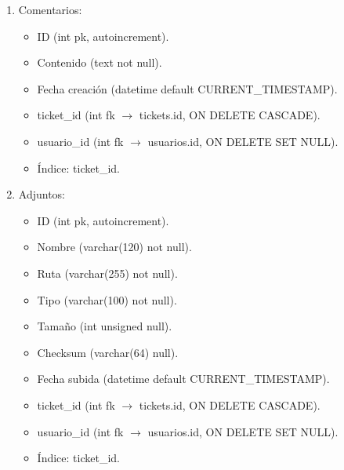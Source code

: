 \documentclass[letter,12pt]{article}
\begin{document}
\begin{enumerate}[leftmargin=*]
    \item Comentarios:
    \begin{itemize}[leftmargin=1.5em,noitemsep,topsep=0pt]
        \item ID (int pk, autoincrement).
        \item Contenido (text not null).
        \item Fecha creación (datetime default CURRENT\_TIMESTAMP).
        \item ticket\_id (int fk $\rightarrow$ tickets.id, ON DELETE CASCADE).
        \item usuario\_id (int fk $\rightarrow$ usuarios.id, ON DELETE SET NULL).
        \item Índice: ticket\_id.
    \end{itemize}

    \item Adjuntos:
    \begin{itemize}[leftmargin=1.5em,noitemsep,topsep=0pt]
        \item ID (int pk, autoincrement).
        \item Nombre (varchar(120) not null).
        \item Ruta (varchar(255) not null).
        \item Tipo (varchar(100) not null).
        \item Tamaño (int unsigned null).
        \item Checksum (varchar(64) null).
        \item Fecha subida (datetime default CURRENT\_TIMESTAMP).
        \item ticket\_id (int fk $\rightarrow$ tickets.id, ON DELETE CASCADE).
        \item usuario\_id (int fk $\rightarrow$ usuarios.id, ON DELETE SET NULL).
        \item Índice: ticket\_id.
    \end{itemize}
\end{enumerate}
\end{document}
